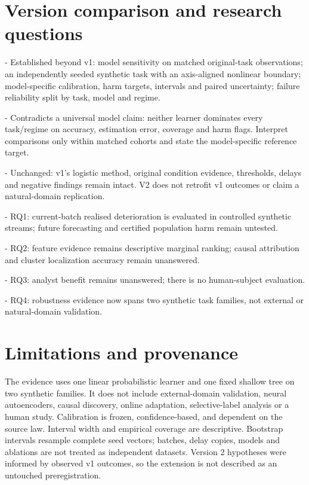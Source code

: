 \documentclass[11pt,a4paper]{article}
\begin{document}
\section{Version comparison and research questions}

- Established beyond v1: model sensitivity on matched original-task observations; an independently seeded synthetic task with an axis-aligned nonlinear boundary; model-specific calibration, harm targets, intervals and paired uncertainty; failure reliability split by task, model and regime.\par
- Contradicts a universal model claim: neither learner dominates every task/regime on accuracy, estimation error, coverage and harm flags. Interpret comparisons only within matched cohorts and state the model-specific reference target.\par
- Unchanged: v1's logistic method, original condition evidence, thresholds, delays and negative findings remain intact. V2 does not retrofit v1 outcomes or claim a natural-domain replication.\par
- RQ1: current-batch realised deterioration is evaluated in controlled synthetic streams; future forecasting and certified population harm remain untested.\par
- RQ2: feature evidence remains descriptive marginal ranking; causal attribution and cluster localization accuracy remain unanswered.\par
- RQ3: analyst benefit remains unanswered; there is no human-subject evaluation.\par
- RQ4: robustness evidence now spans two synthetic task families, not external or natural-domain validation.\par

\section{Limitations and provenance}

The evidence uses one linear probabilistic learner and one fixed shallow tree on two synthetic families. It does not include external-domain validation, neural autoencoders, causal discovery, online adaptation, selective-label analysis or a human study. Calibration is frozen, confidence-based, and dependent on the source law. Interval width and empirical coverage are descriptive. Bootstrap intervals resample complete seed vectors; batches, delay copies, models and ablations are not treated as independent datasets. Version 2 hypotheses were informed by observed v1 outcomes, so the extension is not described as an untouched preregistration.\par
\end{document}

